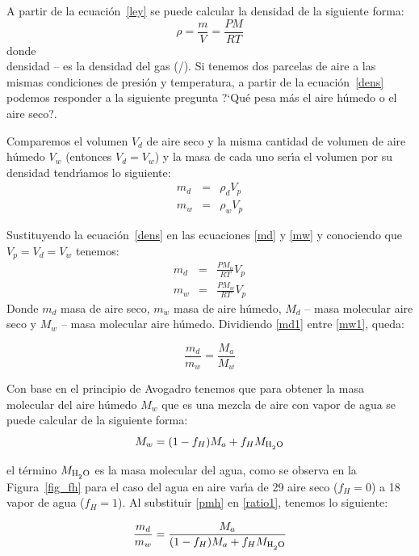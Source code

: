 A partir de la ecuaci\'on~\ref{ley} se puede calcular la densidad de la siguiente forma:
\begin{equation}
\rho=\frac{m}{V}=\frac{PM}{RT}
\label{dens}
\end{equation}
donde\\\gls{densidad} -- es la densidad del gas (\gram/\liter).  Si tenemos dos parcelas de aire a las mismas condiciones de presi\'on y temperatura, a partir de la ecuaci\'on~\ref{dens} podemos responder a la siguiente pregunta ?`Qu\'e pesa m\'as el aire h\'umedo o el aire seco?.

Comparemos el volumen $V_d$ de aire seco y la misma cantidad de volumen de aire h\'umedo $V_w$ (entonces $V_d=V_w$) y la masa de cada uno ser\'{\i}a el volumen por su densidad tendr\'{\i}amos lo siguiente:
\begin{eqnarray}
m_d &= &\rho_d V_p \label{md}\\
 m_w & = & \rho_wV_p \label{mw}
\end{eqnarray}

Sustituyendo la ecuaci\'on~\ref{dens} en las ecuaciones \ref{md} y \ref{mw} y  conociendo que $V_p=V_d=V_w$ tenemos:
\begin{eqnarray}
m_d &= &\frac{PM_a}{RT}V_p \label{md1}\\
 m_w & = &\frac{PM_w}{RT}V_p \label{mw1} 
\end{eqnarray}
Donde $m_d$ masa de aire seco, $m_w$ masa de aire h\'umedo, $M_d$ -- masa molecular aire seco y $M_w$ -- masa molecular aire h\'umedo. Dividiendo  \ref{md1} entre  \ref{mw1}, queda:

\begin{equation}
\frac{m_d}{m_w}=\frac{M_a}{M_w} 
\label{ratio1}
\end{equation}

Con base en el principio de Avogadro tenemos que para obtener la masa molecular  del aire h\'umedo $M_w$ que es una mezcla de aire con vapor de agua se puede calcular de la siguiente forma:
\begin{equation}
M_w= (1-f_H)M_a + f_H M_{\ce{H2O}}
\label{pmh}
\end{equation}

el t\'ermino $M_{\ce{H2O}}$ es la masa molecular del agua, como se observa en la Figura~\ref{fig_fh} para el caso del agua en aire var\'{\i}a de 29 aire seco ($f_H=0$) a 18 vapor de agua ($f_H=1$). Al substituir \ref{pmh} en \ref{ratio1}, tenemos lo siguiente:


\begin{equation}
\frac{m_d}{m_w}=\frac{M_a}{(1-f_H)M_a + f_H M_{\ce{H2O}}} 
\label{ratio2}
\end{equation}

